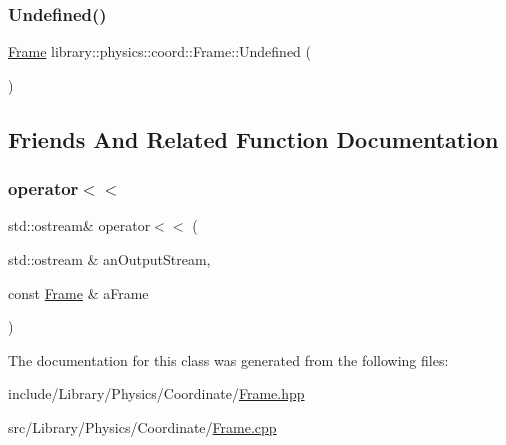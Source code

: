 \subsubsection{\texorpdfstring{Undefined()}{Undefined()}}
{\footnotesize\ttfamily \hyperlink{classlibrary_1_1physics_1_1coord_1_1_frame}{Frame} library\+::physics\+::coord\+::\+Frame\+::\+Undefined (\begin{DoxyParamCaption}{ }\end{DoxyParamCaption})\hspace{0.3cm}{\ttfamily [static]}}



\subsection{Friends And Related Function Documentation}
\mbox{\label{classlibrary_1_1physics_1_1coord_1_1_frame_a509ac1926cfc3553748bace204e2b1cc}} 
\subsubsection{\texorpdfstring{operator$<$$<$}{operator<<}}
{\footnotesize\ttfamily std\+::ostream\& operator$<$$<$ (\begin{DoxyParamCaption}\item[{std\+::ostream \&}]{an\+Output\+Stream,  }\item[{const \hyperlink{classlibrary_1_1physics_1_1coord_1_1_frame}{Frame} \&}]{a\+Frame }\end{DoxyParamCaption})\hspace{0.3cm}{\ttfamily [friend]}}



The documentation for this class was generated from the following files\+:\begin{DoxyCompactItemize}
\item 
include/\+Library/\+Physics/\+Coordinate/\hyperlink{_frame_8hpp}{Frame.\+hpp}\item 
src/\+Library/\+Physics/\+Coordinate/\hyperlink{_frame_8cpp}{Frame.\+cpp}\end{DoxyCompactItemize}
